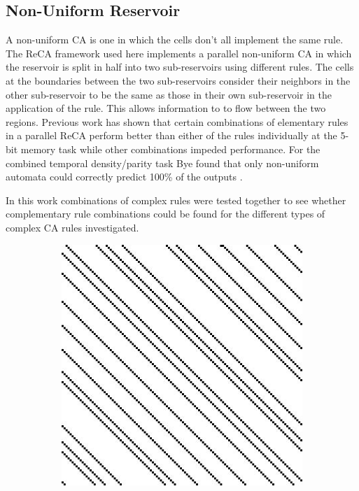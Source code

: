 \documentclass{elsarticle}
\begin{document}
\begin{multicols}{2}
	\subsection{Non-Uniform Reservoir}
	A non-uniform CA is one in which the cells don't all implement the same rule.  
	The ReCA framework used here implements a parallel non-uniform CA in which 
	the reservoir is split in half into two sub-reservoirs  using different 
	rules.  The cells at the boundaries between  the two sub-reservoirs 
	consider their neighbors in the other sub-reservoir to be the same as those 
	in their own sub-reservoir in the application of the rule. This allows 
	information to to flow between the two regions. Previous work has shown 
	that certain combinations of elementary rules in a parallel ReCA perform 
	better than either of the rules individually at the 5-bit memory task while 
	other combinations impeded performance\cite{nichele2017reservoir}. For the 
	combined temporal density/parity task Bye found that only non-uniform 
	automata could correctly predict 100\% of the outputs 
	\cite{bye2016investigation}.
	\par In this work combinations of complex rules were tested together to see 
	whether complementary rule combinations could be found for the different 
	types of complex CA rules investigated.     \begin{figure}[H]
	\centering
	\begin{subfigure}[]{0.475\linewidth}
		\includegraphics[width=\linewidth]{rule48.jpg}

\end{subfigure}
\end{figure}
\end{multicols}
\end{document}
